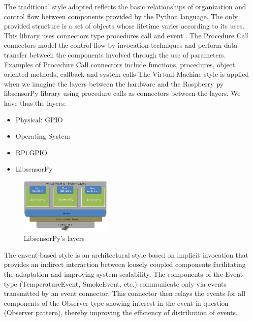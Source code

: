 \documentclass{acm_proc_article-sp}
\begin{document}
The traditional style adopted reflects the basic relationships of organization and control flow between components provided by the Python language. The only provided structure is a set of objects whose lifetime varies according to its uses. This library uses connectors type procedures call and event . The Procedure Call connectors model the control flow by invocation techniques and perform data transfer between the components involved through the use of parameters. Examples of Procedure Call connectors include functions, procedures,  object oriented methods, callback and system calls
\newline
\newline
The Virtual Machine style is applied when we imagine the layers between the hardware and the Raspberry py libsensorPy library using procedure calls as connectors between the layers. We have thus the layers:
\begin{itemize}
\item Physical: GPIO
\item Operating System
\item RPi.GPIO
\item LibsensorPy
\end{itemize}

\begin{figure}[h]
    \includegraphics[width=0.4\textwidth,natwidth=610,natheight=642]{pictures/machinelayers.png}
    \caption{LibsensorPy's layers}
    \label{fig:layers}
\end{figure}

The envent-based style is an architectural style based on implicit invocation that provides an indirect interaction between loosely coupled components facilitating the adaptation and improving system scalability. The components of the Event type (TemperatureEvent, SmokeEvent, etc.) communicate only via events transmitted by an event connector. This connector then relays the events for all components of the Observer type showing interest in the event in question (Observer pattern), thereby improving the efficiency of distribution of events.
\end{document}
